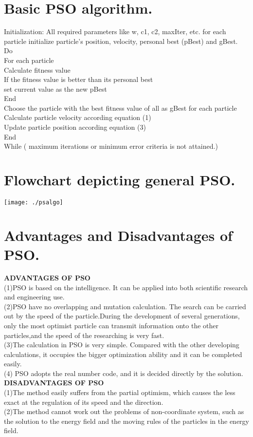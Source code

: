\section{Basic PSO algorithm.}Initialization:
All required parameters like w, c1, c2, maxIter, etc. for each particle initialize particle’s position, velocity, personal best (pBest) and gBest.\\
Do\\
For each particle\\ 
Calculate fitness value\\
If the fitness value is better than its personal best\\
set current value as the new pBest\\
End\\
Choose the particle with the best fitness value of all as gBest for each particle\\ 
Calculate particle velocity according equation (1)\\
Update particle position according equation (3)\\
End\\ 
While ( maximum iterations or minimum error criteria is not attained.)\\
\section{Flowchart depicting general PSO.}
\texttt{[image: ./psalgo]}\\[1cm]
\section{Advantages and Disadvantages of PSO.}\textbf{ADVANTAGES OF PSO}\\
(1)PSO is based on the intelligence. It can be applied into both scientific research and engineering use.\\
(2)PSO have no overlapping and mutation calculation. The search can be carried out by the speed of the particle.During the development of several generations, only the most optimist particle can transmit information onto the other particles,and the speed of the researching is very fast.\\
(3)The calculation in PSO is very simple. Compared with the other developing calculations, it occupies the bigger optimization ability and it can be completed easily.\\
(4) PSO adopts the real number code, and it is decided directly by the solution.\\
\textbf{DISADVANTAGES OF PSO}\\
(1)The method easily suffers from the partial optimism, which causes the less exact at the regulation of its speed and the direction.\\
(2)The method cannot work out the problems of non-coordinate system, such as the solution to the energy field and the moving rules of the particles in the energy field.\\
